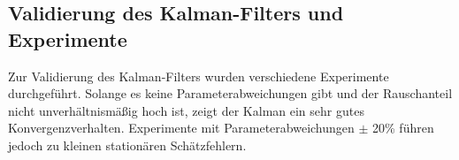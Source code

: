 \documentclass[times, 10pt,twocolumn]{article}
\begin{document}
	\subsection{Validierung des Kalman-Filters und Experimente}
	Zur Validierung des Kalman-Filters wurden verschiedene Experimente durchgeführt. Solange es keine Parameterabweichungen gibt und der Rauschanteil nicht unverhältnismäßig hoch ist, zeigt der Kalman ein sehr gutes Konvergenzverhalten. Experimente mit Parameterabweichungen $\pm$ 20\% führen jedoch zu kleinen stationären Schätzfehlern.
	

\nocite{ex3}
\end{document}

